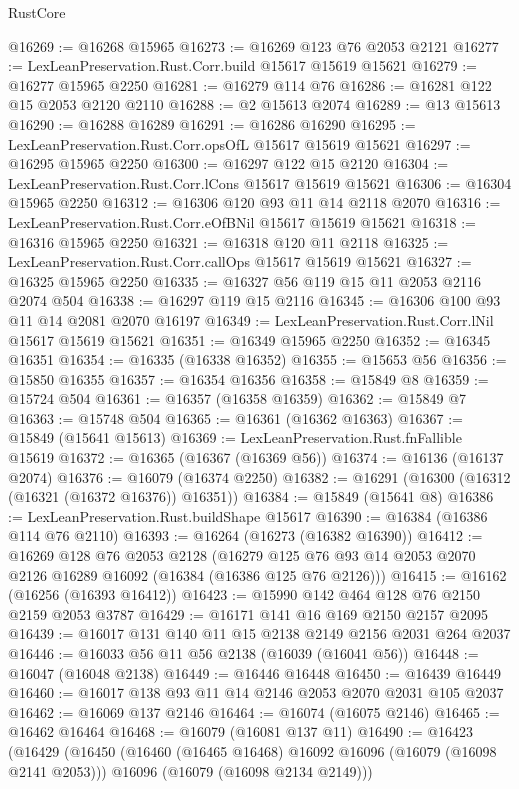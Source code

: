 \begin{lexlean}{RustCore}
\begin{coremodule}
@16269 := @16268 @15965
@16273 := @16269 @123 @76 @2053 @2121
@16277 := LexLeanPreservation.Rust.Corr.build @15617 @15619 @15621
@16279 := @16277 @15965 @2250
@16281 := @16279 @114 @76
@16286 := @16281 @122 @15 @2053 @2120 @2110
@16288 := @2 @15613 @2074
@16289 := @13 @15613
@16290 := @16288 @16289
@16291 := @16286 @16290
@16295 := LexLeanPreservation.Rust.Corr.opsOfL @15617 @15619 @15621
@16297 := @16295 @15965 @2250
@16300 := @16297 @122 @15 @2120
@16304 := LexLeanPreservation.Rust.Corr.lCons @15617 @15619 @15621
@16306 := @16304 @15965 @2250
@16312 := @16306 @120 @93 @11 @14 @2118 @2070
@16316 := LexLeanPreservation.Rust.Corr.eOfBNil @15617 @15619 @15621
@16318 := @16316 @15965 @2250
@16321 := @16318 @120 @11 @2118
@16325 := LexLeanPreservation.Rust.Corr.callOps @15617 @15619 @15621
@16327 := @16325 @15965 @2250
@16335 := @16327 @56 @119 @15 @11 @2053 @2116 @2074 @504
@16338 := @16297 @119 @15 @2116
@16345 := @16306 @100 @93 @11 @14 @2081 @2070 @16197
@16349 := LexLeanPreservation.Rust.Corr.lNil @15617 @15619 @15621
@16351 := @16349 @15965 @2250
@16352 := @16345 @16351
@16354 := @16335 (@16338 @16352)
@16355 := @15653 @56
@16356 := @15850 @16355
@16357 := @16354 @16356
@16358 := @15849 @8
@16359 := @15724 @504
@16361 := @16357 (@16358 @16359)
@16362 := @15849 @7
@16363 := @15748 @504
@16365 := @16361 (@16362 @16363)
@16367 := @15849 (@15641 @15613)
@16369 := LexLeanPreservation.Rust.fnFallible @15619
@16372 := @16365 (@16367 (@16369 @56))
@16374 := @16136 (@16137 @2074)
@16376 := @16079 (@16374 @2250)
@16382 := @16291 (@16300 (@16312 (@16321 (@16372 @16376)) @16351))
@16384 := @15849 (@15641 @8)
@16386 := LexLeanPreservation.Rust.buildShape @15617
@16390 := @16384 (@16386 @114 @76 @2110)
@16393 := @16264 (@16273 (@16382 @16390))
@16412 := @16269
    @128
    @76
    @2053
    @2128
    (@16279 @125 @76 @93 @14 @2053 @2070 @2126 @16289 @16092 (@16384 (@16386 @125 @76 @2126)))
@16415 := @16162 (@16256 (@16393 @16412))
@16423 := @15990 @142 @464 @128 @76 @2150 @2159 @2053 @3787
@16429 := @16171 @141 @16 @169 @2150 @2157 @2095
@16439 := @16017 @131 @140 @11 @15 @2138 @2149 @2156 @2031 @264 @2037
@16446 := @16033 @56 @11 @56 @2138 (@16039 (@16041 @56))
@16448 := @16047 (@16048 @2138)
@16449 := @16446 @16448
@16450 := @16439 @16449
@16460 := @16017 @138 @93 @11 @14 @2146 @2053 @2070 @2031 @105 @2037
@16462 := @16069 @137 @2146
@16464 := @16074 (@16075 @2146)
@16465 := @16462 @16464
@16468 := @16079 (@16081 @137 @11)
@16490 := @16423
    (@16429
      (@16450
        (@16460 (@16465 @16468) @16092 @16096 (@16079 (@16098 @2141 @2053)))
        @16096
        (@16079 (@16098 @2134 @2149)))

\end{coremodule}
\end{lexlean}
